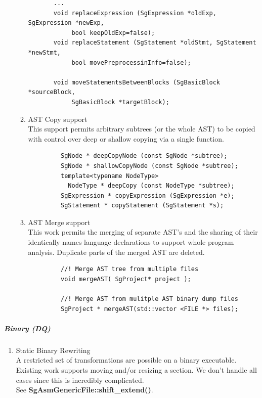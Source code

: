 \begin{enumerate}
\begin{enumerate}
\begin{lstlisting}
       ...
       void replaceExpression (SgExpression *oldExp, SgExpression *newExp, 
            bool keepOldExp=false);
       void replaceStatement (SgStatement *oldStmt, SgStatement *newStmt, 
            bool movePreprocessinInfo=false);
       
       void moveStatementsBetweenBlocks (SgBasicBlock *sourceBlock, 
            SgBasicBlock *targetBlock);
       \end{lstlisting}
       \item AST Copy support \\
         This support permits arbitrary subtrees (or the whole AST) to be copied
         with control over deep or shallow copying via a single function.
         \begin{lstlisting}
         SgNode * deepCopyNode (const SgNode *subtree);
         SgNode * shallowCopyNode (const SgNode *subtree);
         template<typename NodeType>
           NodeType * deepCopy (const NodeType *subtree);
         SgExpression * copyExpression (SgExpression *e);
         SgStatement * copyStatement (SgStatement *s);
         \end{lstlisting}

       \item AST Merge support \\
           This work permits the merging of separate AST's and the sharing of their
           identically names language declarations to support whole program
           analysis. Duplicate parts of the merged AST are deleted.
         \begin{lstlisting}
         //! Merge AST tree from multiple files
         void mergeAST( SgProject* project );

         //! Merge AST from mulitple AST binary dump files
         SgProject * mergeAST(std::vector <FILE *> files);
         \end{lstlisting}


       \end{enumerate} %
   \end{enumerate}  %

\subparagraph{Binary (DQ)}
\begin{enumerate}
   \item Static Binary Rewriting \\
         A restricted set of transformations are possible on a binary executable.
         Existing work supports moving and/or resizing a section. We don't handle 
         all cases since this is incredibly complicated. \\
         See {\bf SgAsmGenericFile::shift\_extend()}.
\end{enumerate}

